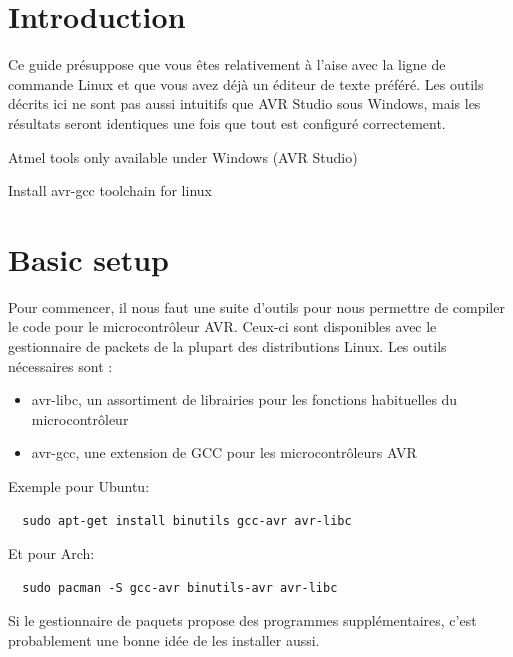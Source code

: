 \documentclass[a4paper]{article}
\begin{document}

\newcommand{\expr}[1]{\og \emph{{#1}} \fg} %
\newcommand{\important}[1]{\textbf{#1}}
\newcommand{\adchip}[0]{\emph{ADE7169}}


\tableofcontents{}

\newpage
\lstset{language=C}
\lstset{language=bash}

\section*{Introduction}
Ce guide présuppose que vous êtes relativement à l'aise avec la ligne de
commande Linux et que vous avez déjà un éditeur de texte préféré. Les outils
décrits ici ne sont pas aussi intuitifs que AVR Studio sous Windows, mais les
résultats seront identiques une fois que tout est configuré correctement.

Atmel tools only available under Windows (AVR Studio)

Install avr-gcc toolchain for linux

\section{Basic setup}
Pour commencer, il nous faut une suite d'outils pour nous permettre de compiler
le code pour le microcontrôleur AVR. Ceux-ci sont disponibles avec le
gestionnaire de packets de la plupart des distributions Linux.
Les outils nécessaires sont :
\begin{itemize}
  \item avr-libc, un assortiment de librairies pour les fonctions habituelles du
    microcontrôleur
  \item avr-gcc, une extension de GCC pour les microcontrôleurs AVR
\end{itemize}

Exemple pour Ubuntu:
\begin{lstlisting}
  sudo apt-get install binutils gcc-avr avr-libc
\end{lstlisting}
Et pour Arch:
\begin{lstlisting}
  sudo pacman -S gcc-avr binutils-avr avr-libc
\end{lstlisting}
Si le gestionnaire de paquets propose des programmes supplémentaires, c'est
probablement une bonne idée de les installer aussi.
\end{document}
